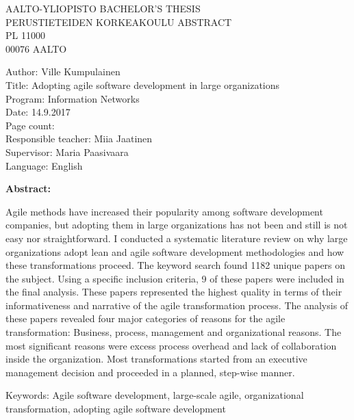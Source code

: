 
\begin{flushleft}
AALTO-YLIOPISTO \hfill BACHELOR'S THESIS \\
PERUSTIETEIDEN KORKEAKOULU \hfill ABSTRACT \\
PL 11000 \\
00076 AALTO \\
\end{flushleft}

\begin{minipage}{15cm}
\begin{framed}
    Author: Ville Kumpulainen \\
    Title: Adopting agile software development in large organizations \\
    Program: Information Networks \\
    Date: 14.9.2017 \\
        Page count:~\pageref{LastPage} \\
        Responsible teacher: Miia Jaatinen \\
        Supervisor: Maria Paasivaara \\
        Language: English
\end{framed}
\end{minipage}

\bigskip

{\large\bfseries Abstract: \par} Agile methods have increased their
popularity among software development companies, but adopting them
in large organizations has not been and still is not easy nor
straightforward. I conducted a systematic literature review on why large
organizations adopt lean and agile software development methodologies
and how these transformations proceed. The keyword search found 1182
unique papers on the subject. Using a specific inclusion criteria,
9 of these papers were included in the final analysis. These papers
represented the highest quality in terms of their informativeness
and narrative of the agile transformation process. The analysis of
these papers revealed four major categories of reasons for the agile
transformation: Business, process, management and organizational
reasons. The most significant reasons were excess process overhead and
lack of collaboration inside the organization. Most transformations
started from an executive management decision and proceeded in a
planned, step-wise manner.

\medskip

\begin{minipage}{15cm}
\begin{framed}
        Keywords: Agile software development, large-scale agile, organizational
        transformation, adopting agile software development
\end{framed}
\end{minipage}
